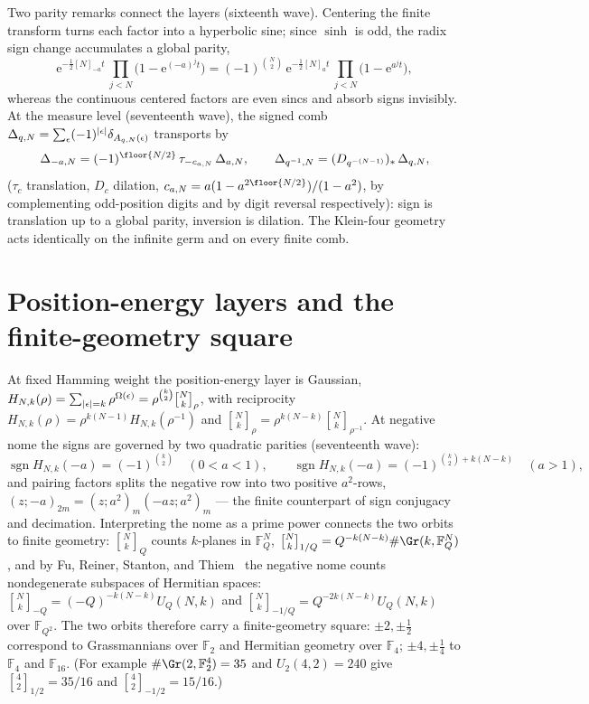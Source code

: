 \documentclass[11pt,oneside]{article}
\numberwithin{equation}{section}
\theoremstyle{definition}
\theoremstyle{remark}
\newcommand{\sgn}{\operatorname{sgn}}
\newcommand{\e}{\mathrm e}
\newcommand{\qbinom}[3]{\genfrac{[}{]}{0pt}{}{#1}{#2}_{#3}}
\begin{document}
Two parity remarks connect the layers (sixteenth wave).  Centering the finite
transform turns each factor into a hyperbolic sine; since $\sinh$ is odd, the
radix sign change accumulates a global parity,
\begin{equation}\label{p7:eq:sinh-parity}
 \e^{-\frac12[N]_{-a}t}\,\prod_{j<N}\bigl(1-\e^{(-a)^jt}\bigr)
 =(-1)^{\binom N2}\,
 \e^{-\frac12[N]_{a}t}\,\prod_{j<N}\bigl(1-\e^{a^jt}\bigr),
\end{equation}
whereas the continuous centered factors are even sincs and absorb signs
invisibly.  At the measure level (seventeenth wave), the signed comb
$\Delta_{q,N}=\sum_\epsilon(-1)^{\left\lvert \epsilon\right\rvert}\delta_{A_{q,N}(\epsilon)}$
transports by
\begin{equation}\label{p7:eq:comb-transport}
 \Delta_{-a,N}=(-1)^{\floor{N/2}}\,\tau_{-c_{a,N}}\,\Delta_{a,N},
 \qquad
 \Delta_{q^{-1},N}=(D_{q^{-(N-1)}})_*\,\Delta_{q,N},
\end{equation}
($\tau_c$ translation, $D_c$ dilation, $c_{a,N}=a(1-a^{2\floor{N/2}})/(1-a^2)$,
by complementing odd-position digits and by digit reversal respectively):
sign is translation up to a global parity, inversion is dilation.  The
Klein-four geometry acts identically on the infinite germ and on every finite
comb.

\section{Position-energy layers and the finite-geometry square}
\label{p7:sec:position-energy}

At fixed Hamming weight the position-energy layer is Gaussian,
$H_{N,k}(\rho)=\sum_{\abs\epsilon=k}\rho^{\Omega(\epsilon)}
=\rho^{\binom k2}\qbinom Nk\rho$, with reciprocity
$H_{N,k}(\rho)=\rho^{k(N-1)}H_{N,k}(\rho^{-1})$ and
$\qbinom Nk\rho=\rho^{k(N-k)}\qbinom Nk{\rho^{-1}}$.  At negative nome the
signs are governed by two quadratic parities (seventeenth wave):
\begin{equation}\label{p7:eq:H-signs}
 \sgn H_{N,k}(-a)=(-1)^{\binom k2}
 \quad(0<a<1),
 \qquad
 \sgn H_{N,k}(-a)=(-1)^{\binom k2+k(N-k)}
 \quad(a>1),
\end{equation}
and pairing factors splits the negative row into two positive $a^2$-rows,
$(z;-a)_{2m}=(z;a^2)_m(-az;a^2)_m$ --- the finite counterpart of sign
conjugacy and decimation.  Interpreting the nome as a prime power connects
the two orbits to finite geometry: $\qbinom NkQ$ counts $k$-planes in
$\mathbb F_Q^N$, $\qbinom Nk{1/Q}=Q^{-k(N-k)}\#\Gr(k,\mathbb F_Q^N)$, and by
Fu, Reiner, Stanton, and Thiem~\cite{p7:fu-reiner-stanton-thiem} the negative
nome counts nondegenerate subspaces of Hermitian spaces:
$\qbinom Nk{-Q}=(-Q)^{-k(N-k)}U_Q(N,k)$ and
$\qbinom Nk{-1/Q}=Q^{-2k(N-k)}U_Q(N,k)$ over $\mathbb F_{Q^2}$.  The two
orbits therefore carry a finite-geometry square: $\pm2,\pm\tfrac12$
correspond to Grassmannians over $\mathbb F_2$ and Hermitian geometry over
$\mathbb F_4$; $\pm4,\pm\tfrac14$ to $\mathbb F_4$ and $\mathbb F_{16}$.
(For example $\#\Gr(2,\mathbb F_2^4)=35$ and $U_2(4,2)=240$ give
$\qbinom42{1/2}=35/16$ and $\qbinom42{-1/2}=15/16$.)
\end{document}
